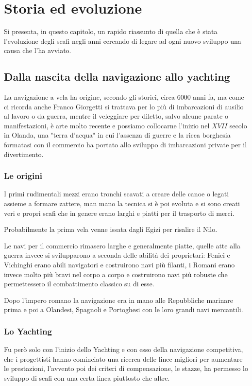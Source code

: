 \chapter{Storia ed evoluzione}
	\begin{chapabstract}
		Si presenta, in questo capitolo, un rapido riassunto di quella che è stata l'evoluzione degli scafi negli anni cercando di legare ad ogni nuovo sviluppo una causa che l'ha avviato.
	\end{chapabstract}
	
	\section{Dalla nascita della navigazione allo yachting}
		La navigazione a vela ha origine, secondo gli storici, circa $6000$ anni fa, ma come ci ricorda anche Franco Giorgetti \cite{book:StoriaGiorgetti} si trattava per lo più di imbarcazioni di ausilio al lavoro o da guerra, mentre il veleggiare per diletto, salvo alcune parate o manifestazioni, è arte molto recente e possiamo collocarne l'inizio nel $XVII$ secolo in Olanda, una "terra d'acqua" in cui l'assenza di guerre e la ricca borghesia formatasi con il commercio ha portato allo sviluppo di imbarcazioni private per il divertimento.
	
		\subsection{Le origini}
			I primi rudimentali mezzi erano tronchi scavati a creare delle canoe o legati assieme a formare zattere, man mano la tecnica si è poi evoluta e si sono creati veri e propri scafi che in genere erano larghi e piatti per il trasporto di merci.
		
			Probabilmente la prima vela venne issata dagli Egizi per risalire il Nilo.
		
			Le navi per il commercio rimasero larghe e generalmente piatte, quelle atte alla guerra invece si svilupparono a seconda delle abilità dei proprietari: Fenici e Vichinghi erano abili navigatori e costruirono navi più filanti, i Romani erano invece molto più bravi nel corpo a corpo e costruirono navi più robuste che permettessero il combattimento classico su di esse.
		
			Dopo l'impero romano la navigazione era in mano alle Repubbliche marinare prima e poi a Olandesi, Spagnoli e Portoghesi con le loro grandi navi mercantili.
		
		\subsection{Lo Yachting}
			Fu però solo con l'inizio dello Yachting e con esso della navigazione competitiva, che i progettisti hanno cominciato una ricerca delle linee migliori per aumentare le prestazioni, l'avvento poi dei criteri di compensazione, le stazze, ha permesso lo sviluppo di scafi con una certa linea piuttosto che altre.
		
